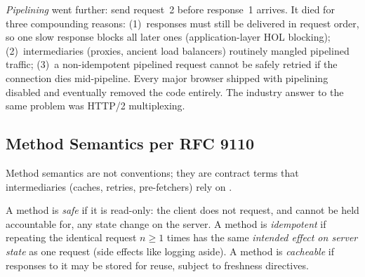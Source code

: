 \emph{Pipelining} went further: send request~2 before response~1 arrives. It died for three compounding reasons: (1)~responses must still be delivered in request order, so one slow response blocks all later ones (application-layer HOL blocking); (2)~intermediaries (proxies, ancient load balancers) routinely mangled pipelined traffic; (3)~a non-idempotent pipelined request cannot be safely retried if the connection dies mid-pipeline. Every major browser shipped with pipelining disabled and eventually removed the code entirely. The industry answer to the same problem was HTTP/2 multiplexing.

\subsection{Method Semantics per RFC 9110}

Method semantics are not conventions; they are contract terms that intermediaries (caches, retries, pre-fetchers) rely on \cite{rfc9110}.

\begin{definition}
A method is \emph{safe} if it is read-only: the client does not request, and cannot be held accountable for, any state change on the server. A method is \emph{idempotent} if repeating the identical request $n \geq 1$ times has the same \emph{intended effect on server state} as one request (side effects like logging aside). A method is \emph{cacheable} if responses to it may be stored for reuse, subject to freshness directives.
\end{definition}

